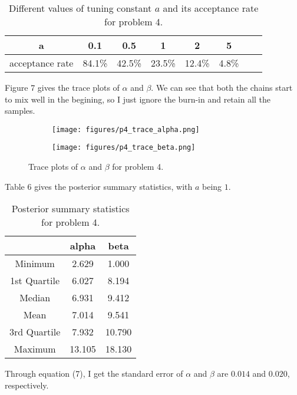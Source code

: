 \documentclass[12pt]{article}
\begin{document}
\begin{table}[H]
\centering
\caption{Different values of tuning constant $a$ and its acceptance rate for problem 4.}
\label{my-label}
\begin{tabular}{|c|c|c|c|c|c|c|c|}
\hline
a               & 0.1    & 0.5      & 1      & 2      & 5   \\ \hline
acceptance rate & 84.1\% & 42.5\% & 23.5\% & 12.4\% & 4.8\%   \\ \hline
\end{tabular}
\end{table}

Figure 7 gives the trace plots of $\alpha$ and $\beta$. We can see that both the chains start to mix well in the begining, so I just ignore the burn-in and retain all the samples.

\begin{figure}[H]
\begin{subfigure}{.5\textwidth}
  \centering
  \texttt{[image: figures/p4\_trace\_alpha.png]}
\end{subfigure}
\begin{subfigure}{.5\textwidth}
  \centering
  \texttt{[image: figures/p4\_trace\_beta.png]}
\end{subfigure}
\caption{Trace plots of $\alpha$ and $\beta$ for problem 4.}
\end{figure}

Table 6 gives the posterior summary statistics, with $a$ being $1$.

\begin{table}[H]
\centering
\caption{Posterior summary statistics for problem 4.}
\label{my-label}
\begin{tabular}{|c|c|c|}
\hline
             & alpha  & beta   \\ \hline
Minimum      & 2.629  & 1.000  \\ \hline
1st Quartile & 6.027  & 8.194  \\ \hline
Median       & 6.931  & 9.412  \\ \hline
Mean         & 7.014  & 9.541  \\ \hline
3rd Quartile & 7.932  & 10.790 \\ \hline
Maximum      & 13.105 & 18.130 \\ \hline
\end{tabular}
\end{table}

Through equation (7), I get the standard error of $\alpha$ and $\beta$ are $0.014$ and $0.020$, respectively. 
\end{document}
